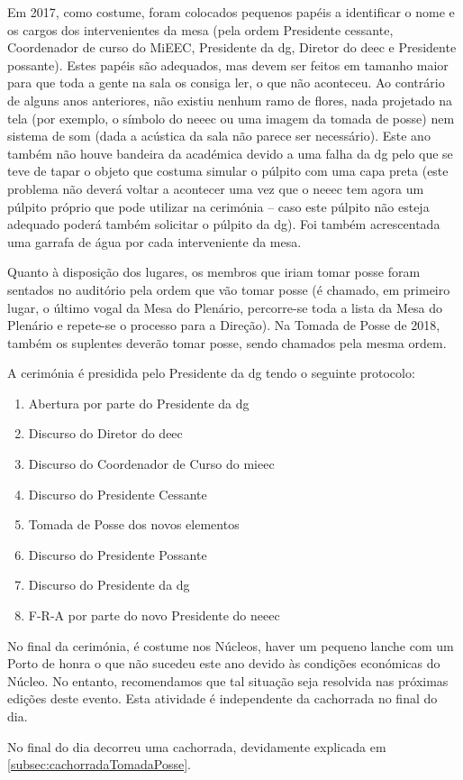 Em 2017, como costume, foram colocados pequenos papéis a identificar o nome e os cargos dos intervenientes da mesa (pela ordem Presidente cessante, Coordenador de curso do MiEEC, Presidente da \acrshort{dg}, Diretor do \acrshort{deec} e Presidente possante). Estes papéis são adequados, mas devem ser feitos em tamanho maior para que toda a gente na sala os consiga ler, o que não aconteceu. Ao contrário de alguns anos anteriores, não existiu nenhum ramo de flores, nada projetado na tela (por exemplo, o símbolo do \acrshort{neeec} ou uma imagem da tomada de posse) nem sistema de som (dada a acústica da sala não parece ser necessário). Este ano também não houve bandeira da académica devido a uma falha da \acrshort{dg} pelo que se teve de tapar o objeto que costuma simular o púlpito com uma capa preta (este problema não deverá voltar a acontecer uma vez que o \acrshort{neeec} tem agora um púlpito próprio que pode utilizar na cerimónia – caso este púlpito não esteja adequado poderá também solicitar o púlpito da \acrshort{dg}). Foi também acrescentada uma garrafa de água por cada interveniente da mesa.

Quanto à disposição dos lugares, os membros que iriam tomar posse foram sentados no auditório pela ordem que vão tomar posse (é chamado, em primeiro lugar, o último vogal da Mesa do Plenário, percorre-se toda a lista da Mesa do Plenário e repete-se o processo para a Direção). Na Tomada de Posse de 2018, também os suplentes deverão tomar posse, sendo chamados pela mesma ordem.

A cerimónia é presidida pelo Presidente da \acrshort{dg} tendo o seguinte protocolo:
\begin{enumerate}
\item Abertura por parte do Presidente da \acrshort{dg}
\item Discurso do Diretor do \acrshort{deec}
\item Discurso do Coordenador de Curso do \acrshort{mieec}
\item Discurso do Presidente Cessante
\item Tomada de Posse dos novos elementos
\item Discurso do Presidente Possante
\item Discurso do Presidente da \acrshort{dg}
\item F-R-A por parte do novo Presidente do \acrshort{neeec}
\end{enumerate}

No final da cerimónia, é costume nos Núcleos, haver um pequeno lanche com um Porto de honra o que não sucedeu este ano devido às condições económicas do Núcleo. No entanto, recomendamos que tal situação seja resolvida nas próximas edições deste evento. Esta atividade é independente da cachorrada no final do dia.

{ %
No final do dia decorreu uma cachorrada, devidamente explicada em \ref{subsec:cachorradaTomadaPosse}.
}
{ %
}